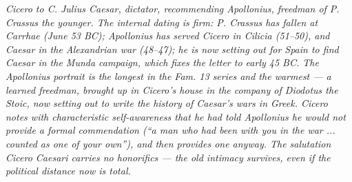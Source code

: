
\textit{Cicero to C. Julius Caesar, dictator, recommending Apollonius,
freedman of P. Crassus the younger. The internal dating is firm:
P. Crassus has fallen at Carrhae (June 53 BC); Apollonius has served
Cicero in Cilicia (51--50), and Caesar in the Alexandrian war
(48--47); he is now setting out for Spain to find Caesar in the
Munda campaign, which fixes the letter to early 45 BC. The
Apollonius portrait is the longest in the Fam. 13 series and the
warmest --- a learned freedman, brought up in Cicero's house in
the company of Diodotus the Stoic, now setting out to write the
history of Caesar's wars in Greek. Cicero notes with characteristic
self-awareness that he had told Apollonius he would not provide a
formal commendation (``a man who had been with you in the war ...
counted as one of your own''), and then provides one anyway. The
salutation \textit{Cicero Caesari} carries no honorifics --- the old
intimacy survives, even if the political distance now is total.}
